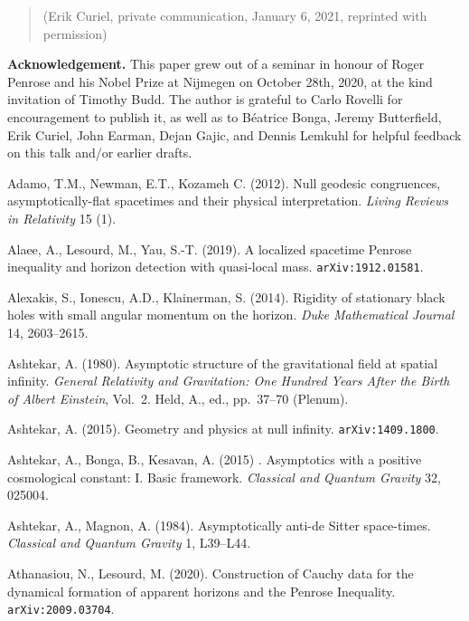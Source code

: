 \documentclass[11pt,a4paper]{article}
\begin{document}
\begin{quote}
\begin{small}
(Erik Curiel, private communication, January 6, 2021, reprinted with permission)
\end{small}
\end{quote}
\newpage

\noindent \textbf{Acknowledgement.} This paper grew out of a seminar in honour of Roger Penrose and his Nobel Prize at Nijmegen on October 28th, 2020, at the kind invitation of Timothy Budd. The author is grateful to Carlo Rovelli for encouragement to publish it, as well as to B\'{e}atrice Bonga, Jeremy Butterfield, Erik Curiel, John Earman,  Dejan Gajic, and Dennis Lemkuhl for helpful feedback on this talk and/or earlier drafts.
\smallskip

\begin{small}
\begin{thebibliography}{99}
\item[]  Adamo, T.M.,  Newman, E.T.,  Kozameh C. (2012). Null geodesic congruences, asymptotically-flat spacetimes and their physical interpretation.  \emph{Living Reviews in Relativity} 15 (1).
\item[]  Alaee, A.,  Lesourd, M., Yau, S.-T. (2019). A localized spacetime Penrose inequality and horizon detection with quasi-local mass. \texttt{arXiv:1912.01581}. 
\item[]  Alexakis, S.,  Ionescu, A.D.,  Klainerman, S. (2014). Rigidity of stationary black holes with small angular momentum on the horizon. \emph{Duke Mathematical Journal}  14, 2603--2615.
\item[] Ashtekar, A. (1980). Asymptotic structure of the gravitational field at spatial infinity.
 \emph{General Relativity and Gravitation: One Hundred Years After the Birth of Albert Einstein}, Vol.\ 2.
 Held, A., ed., pp.\ 37--70 (Plenum). 
\item[] Ashtekar, A. (2015). Geometry and physics at null infinity. \texttt{arXiv:1409.1800}.
 \item[]  Ashtekar, A.,  Bonga, B., Kesavan, A.  (2015) . Asymptotics with a positive cosmological constant: I. Basic framework. \emph{Classical and Quantum Gravity} 32, 025004. 
  \item[]  Ashtekar, A.,   Magnon, A. (1984). 
  Asymptotically anti-de Sitter space-times.  \emph{Classical and Quantum Gravity} 1, L39--L44. 
\item[]   Athanasiou, N.,  Lesourd, M. (2020).  Construction of Cauchy data for the dynamical formation of apparent horizons and the Penrose Inequality. \texttt{arXiv:2009.03704}.

\end{thebibliography}
\end{small}
\end{document}
